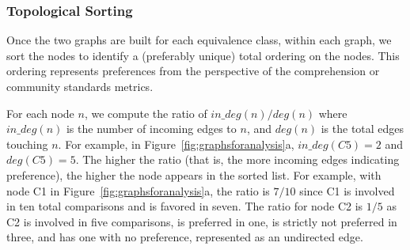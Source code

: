 \subsubsection{Topological Sorting}
Once the two graphs are built for each equivalence class, within each graph, we sort the nodes to identify a (preferably unique) total ordering on the nodes. This ordering represents preferences from the perspective of the comprehension or community standards metrics. 

For each node $n$, we compute the ratio of $in\_deg(n) / deg(n)$ where $in\_deg(n)$ is the number of incoming edges to $n$, and $deg(n)$ is the total edges touching $n$. For example, in Figure~\ref{fig:graphsforanalysis}a, $in\_deg(C5) = 2$ and $deg(C5) = 5$. 
The higher the ratio (that is, the more incoming edges indicating preference), the higher the node appears in the sorted list. For example, with node C1 in Figure~\ref{fig:graphsforanalysis}a, the ratio is $7 / 10$ since C1 is involved in ten total comparisons and is favored in seven. The ratio for node C2 is $1 / 5$ as C2 is involved in five comparisons, is preferred in one, is strictly not preferred in three, and has one with no preference, represented as an undirected edge. 

